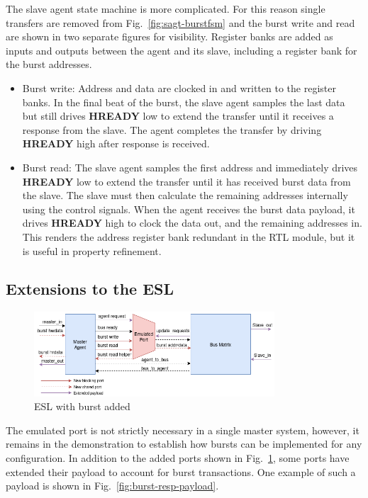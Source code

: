 The slave agent state machine is more complicated. For this reason single transfers are removed from Fig.~\ref{fig:sagt-burstfsm} and the burst write and read are shown in two separate figures for visibility. Register banks are added as inputs and outputs between the agent and its slave, including a register bank for the burst addresses. 
\begin{itemize}
 \item Burst write: Address and data are clocked in and written to the register banks. In the final beat of the burst, the slave agent samples the last data but still drives \textbf{HREADY} low to extend the transfer until it receives a response from the slave. The agent completes the transfer by driving \textbf{HREADY} high after response is received.
 \item Burst read: The slave agent samples the first address and immediately drives \textbf{HREADY} low to extend the transfer until it has received burst data from the slave. The slave must then calculate the remaining addresses internally using the control signals. When the agent receives the burst data payload, it drives \textbf{HREADY} high to clock the data out, and the remaining addresses in. This renders the address register bank redundant in the RTL module, but it is useful in property refinement.  
\end{itemize}

\subsection{Extensions to the ESL}
\begin{figure}[hbt]
    \begin{center}
        \includegraphics[width=0.8\textwidth]{figs/ESL/burst_esl.png}
    \end{center}
    \caption{ESL with burst added}
    \label{fig:esl-burst}
\end{figure}

The emulated port is not strictly necessary in a single master system, however, it remains in the demonstration to establish how bursts can be implemented for any configuration. In addition to the added ports shown in Fig.~\ref{fig:esl-burst}, some ports have extended their payload to account for burst transactions. One example of such a payload is shown in Fig.~\ref{fig:burst-resp-payload}. \par
 
